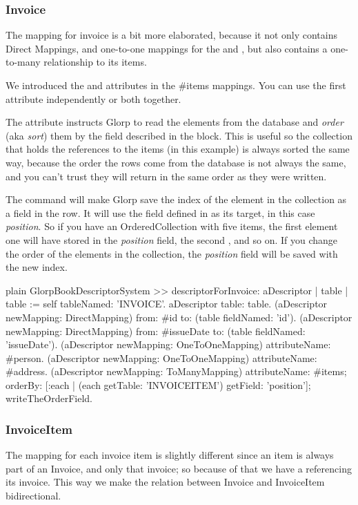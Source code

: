 \documentclass[10pt,twoside,english]{_support/latex/sbabook/sbabook}
\begin{document}
\subsubsection{Invoice}
The mapping for invoice is a bit more elaborated, because it not only
contains Direct Mappings, and one-to-one mappings for the  and
, but also contains a one-to-many relationship to its items.

We introduced the  and  attributes in
the \#items mappings. You can use the first attribute independently or both together.

The  attribute instructs
Glorp to read the elements from the database and \textit{order} (aka \textit{sort}) them
by the field described in the block. This is useful so the collection that holds
the references to the items (in this example) is always sorted the same way,
because the order the rows come from the database is not always the same,
and you can't trust they will return in the same order as they were written.

The  command will make Glorp save the index of the
element in the collection as a field in the row. It will use the field defined
in  as its target, in this case \textit{position}. So if you have an
OrderedCollection with five items, the first element one will have  stored
in the \textit{position} field, the second , and so on. If you change the order
of the elements in the collection, the \textit{position} field will be saved with the
new index.

\begin{displaycode}{plain}
GlorpBookDescriptorSystem >> descriptorForInvoice: aDescriptor
	| table |
	table := self tableNamed: 'INVOICE'.
	aDescriptor table: table.
	(aDescriptor newMapping: DirectMapping)
		from: #id
		to: (table fieldNamed: 'id').
	(aDescriptor newMapping: DirectMapping)
		from: #issueDate
		to: (table fieldNamed: 'issueDate').
	(aDescriptor newMapping: OneToOneMapping)
		attributeName: #person.
	(aDescriptor newMapping: OneToOneMapping)
		attributeName: #address.
	(aDescriptor newMapping: ToManyMapping)
		attributeName: #items;
		orderBy: [:each |
			(each getTable: 'INVOICEITEM') getField: 'position'];
		writeTheOrderField.
\end{displaycode}
\subsubsection{InvoiceItem}
The mapping for each invoice item is slightly different since an item is always
part of an Invoice, and only that invoice; so because of that we have a
 referencing its invoice. This way we make the relation
between Invoice and InvoiceItem bidirectional.
\end{document}
